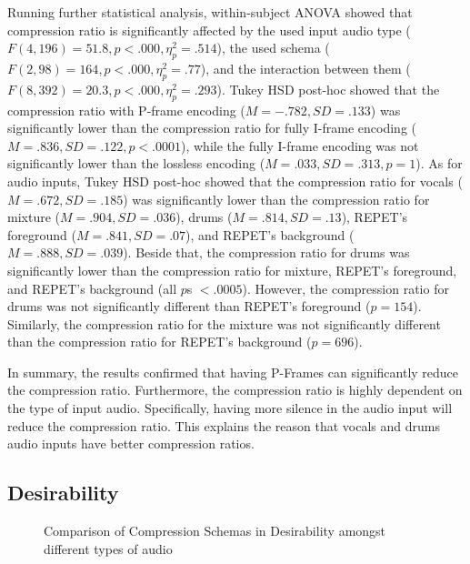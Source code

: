 Running further statistical analysis,  within-subject ANOVA showed that compression ratio is significantly affected by the used input audio type ($F(4,196)=51.8, p<.000, \eta_{p}^{2}=.514$), the used schema ($F(2,98)=164, p<.000, \eta_{p}^{2}=.77$), and the interaction between them ($F(8,392)=20.3, p<.000, \eta_{p}^{2}=.293$).
Tukey HSD post-hoc showed that the compression ratio with P-frame encoding ($M=-.782, SD=.133$) was significantly lower than the compression ratio for fully I-frame encoding ($M=.836, SD=.122, p<.0001$), while the fully I-frame encoding was not significantly lower than the lossless encoding ($M=.033, SD=.313, p=1$).
As for audio inputs, Tukey HSD post-hoc showed that the compression ratio for vocals ($M=.672, SD=.185$) was significantly lower than the compression ratio for mixture ($M=.904, SD=.036$), drums ($M=.814, SD=.13$), REPET's foreground ($M=.841, SD=.07$), and REPET's background ($M=.888, SD=.039$).
Beside that, the compression ratio for drums was significantly lower than the compression ratio for mixture, REPET's foreground, and REPET's background (all $p$s $<.0005$).
However, the compression ratio for drums was not significantly different than REPET's foreground ($p=154$). Similarly, the compression ratio for the mixture was not significantly different than the compression ratio for REPET's background ($p=696$).

In summary, the results confirmed that having P-Frames can significantly reduce the compression ratio.
Furthermore, the compression ratio is highly dependent on the type of input audio. Specifically, having more silence in the audio input will reduce the compression ratio.
This explains the reason that vocals and drums audio inputs have better compression ratios.

\subsection{Desirability}

\begin{figure}[ht]
  
  \caption{Comparison of Compression Schemas in Desirability amongst different types of audio}
  \label{fig:input-desirable}
\end{figure}

